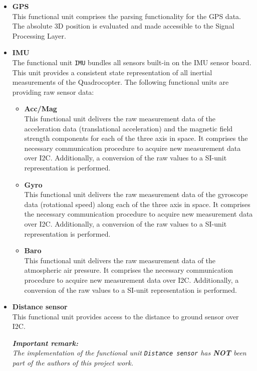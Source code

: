 \begin{itemize}
	\item \textbf{GPS}\\
	This functional unit comprises the parsing functionality for the GPS data. The absolute 3D position is evaluated and made accessible to the Signal Processing Layer.
	
	\item \textbf{IMU}\\
	The functional unit \texttt{IMU} bundles all sensors built-in on the IMU sensor board. This unit provides a consistent state representation of all inertial measurements of the Quadrocopter. The following functional units are providing raw sensor data: 
	
	\begin{itemize}
		\item \textbf{Acc/Mag}\\
		This functional unit delivers the raw measurement data of the acceleration data (translational acceleration) and the magnetic field strength components for each of the three axis in space. It comprises the necessary communication procedure to acquire new measurement data over I2C. Additionally, a conversion of the raw values to a SI-unit representation is performed.
		
		\item \textbf{Gyro}\\
		This functional unit delivers the raw measurement data of the gyroscope data (rotational speed) along each of the three axis in space. It comprises the necessary communication procedure to acquire new measurement data over I2C. Additionally, a conversion of the raw values to a SI-unit representation is performed.
		
		\item \textbf{Baro}\\
		This functional unit delivers the raw measurement data of the atmospheric air pressure. It comprises the necessary communication procedure to acquire new measurement data over I2C. Additionally, a conversion of the raw values to a SI-unit representation is performed.
	\end{itemize}
	
	\item \textbf{Distance sensor}\\
	This functional unit provides access to the distance to ground sensor over I2C.
	
	\textit{\textbf{Important remark:}\\
	The implementation of the functional unit \texttt{Distance sensor} has \textbf{NOT} been part of the authors of this project work.}
	

\end{itemize}
